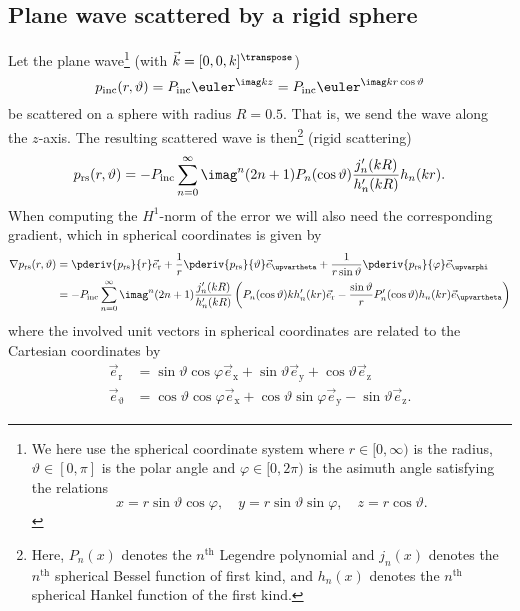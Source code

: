 \subsection{Plane wave scattered by a rigid sphere}
Let the plane wave\footnote{We here use the spherical coordinate system where $r\in[0,\infty)$ is the radius, $\vartheta\in[0,\pi]$ is the polar angle and $\varphi\in[0,2\pi)$ is the asimuth angle satisfying the relations
\begin{equation*}
	x = r\sin\vartheta\cos\varphi,\quad y = r\sin\vartheta\sin\varphi,\quad z = r\cos\vartheta.
\end{equation*}
} (with $\vec{k}=[0, 0, k]^\transpose$)
\begin{equation*}
	p_{\textrm{inc}}(r,\vartheta) = P_{\mathrm{inc}}\euler^{\imag kz} = P_{\mathrm{inc}}\euler^{\imag kr\cos\vartheta}
\end{equation*}
be scattered on a sphere with radius $R=0.5$. That is, we send the wave along the $z$-axis. The resulting scattered wave is then\footnote{Here, $P_n(x)$ denotes the $n^{\mathrm{th}}$ Legendre polynomial and $j_n(x)$ denotes the $n^{\mathrm{th}}$ spherical Bessel function of first kind, and $h_n(x)$ denotes the $n^{\mathrm{th}}$ spherical Hankel function of the first kind.} (rigid scattering)
\begin{equation}\label{Eq2:rigidScattering_p}
	p_{\mathrm{rs}} (r,\vartheta) = -P_{\mathrm{inc}}\sum_{n=0}^\infty \imag^n (2n+1) P_n(\cos\vartheta)\frac{j_n'(kR)}{h_n'(kR)} h_n(kr).
\end{equation}
When computing the $H^1$-norm of the error we will also need the corresponding gradient, which in spherical coordinates is given by
\begin{align*}
	\nabla p_{\mathrm{rs}} (r,\vartheta) &= \pderiv{p_{\mathrm{rs}}}{r}\vec{e}_{\mathrm{r}} + \frac{1}{r}\pderiv{p_{\mathrm{rs}}}{\vartheta}\vec{e}_{\upvartheta} + \frac{1}{r\sin\vartheta}\pderiv{p_{\mathrm{rs}}}{\varphi}\vec{e}_{\upvarphi}\\
	&= -P_{\mathrm{inc}}\sum_{n=0}^\infty \imag^n (2n+1) \frac{j_n'(kR)}{h_n'(kR)} \left(P_n(\cos\vartheta)kh_n'(kr)\vec{e}_{\mathrm{r}} - \frac{\sin\vartheta}{r}P_n'(\cos\vartheta)h_n(kr)\vec{e}_{\upvartheta}\right)
\end{align*}
where the involved unit vectors in spherical coordinates are related to the Cartesian coordinates by
\begin{align*}
	\vec{e}_{\mathrm{r}} &= \sin\vartheta\cos\varphi\vec{e}_{\mathrm{x}} + \sin\vartheta\vec{e}_{\mathrm{y}} + \cos\vartheta\vec{e}_{\mathrm{z}}\\
	\vec{e}_{\upvartheta} &= \cos\vartheta\cos\varphi\vec{e}_{\mathrm{x}} + \cos\vartheta\sin\varphi\vec{e}_{\mathrm{y}} - \sin\vartheta\vec{e}_{\mathrm{z}}.
\end{align*}
